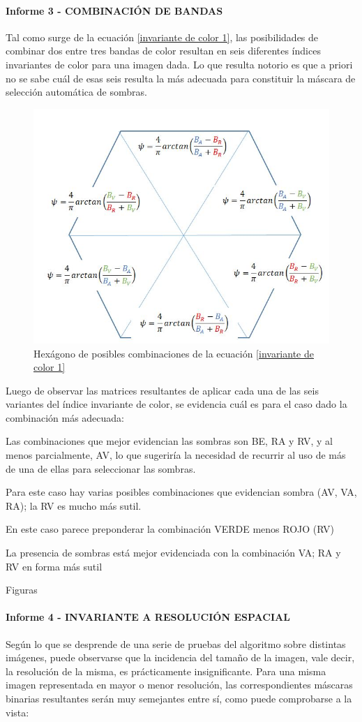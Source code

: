  

\paragraph{Informe 3 - COMBINACIÓN DE BANDAS}

Tal como surge de la ecuación \ref{invariante de color 1}, las posibilidades de combinar dos entre tres bandas de color resultan en seis diferentes índices invariantes de color para una imagen dada. Lo que resulta notorio es que a priori no se sabe cuál de esas seis resulta la más adecuada para constituir la máscara de selección automática de sombras. 

\begin{figure}[H]
    \centering
    \includegraphics[width=0.5\linewidth]{Imagenes//Comparativo Homo-IIC/hexagono.JPG}
    \caption{Hexágono de posibles combinaciones de la ecuación \ref{invariante de color 1}}
    \label{hexagono}
\end{figure}

Luego de observar las matrices resultantes de aplicar cada una de las seis variantes del índice invariante de color, se evidencia cuál es para el caso dado la combinación más adecuada:

Las combinaciones que mejor evidencian las sombras son BE, RA y RV, y al menos parcialmente, AV, lo que sugeriría la necesidad de recurrir al uso de más de una de ellas para seleccionar las sombras.

Para este caso hay varias posibles combinaciones que evidencian sombra (AV, VA, RA); la RV es mucho más sutil.

En este caso parece preponderar la combinación VERDE menos ROJO (RV)

La presencia de sombras está mejor evidenciada con la combinación VA; RA y RV en forma más sutil

Figuras

\paragraph{Informe 4 - INVARIANTE A RESOLUCIÓN ESPACIAL}
 Según lo que se desprende de una serie de pruebas del algoritmo sobre distintas imágenes, puede observarse que la incidencia del tamaño de la imagen, vale decir, la resolución de la misma, es prácticamente insignificante. Para una misma imagen representada en mayor o menor resolución, las correspondientes máscaras binarias resultantes serán muy semejantes entre sí, como puede comprobarse a la vista:

